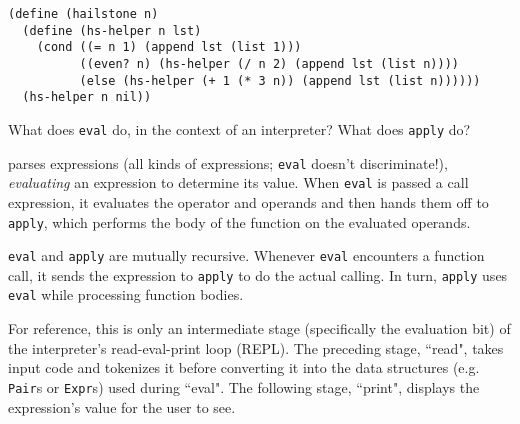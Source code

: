 \documentclass[twoside]{article}
\newcommand{\solution}[1]{{\color{red}#1}}
\begin{document}
\begin{enumerate}

\begin{lstlisting}
(define (hailstone n)
  (define (hs-helper n lst)
    (cond ((= n 1) (append lst (list 1)))
          ((even? n) (hs-helper (/ n 2) (append lst (list n))))
          (else (hs-helper (+ 1 (* 3 n)) (append lst (list n))))))
  (hs-helper n nil))
\end{lstlisting}


What does {\tt eval} do, in the context of an interpreter? What does {\tt apply} do?

\solution{{\tt eval} parses expressions (all kinds of expressions; {\tt eval} doesn't discriminate!), \emph{evaluating} an expression to determine its value. When {\tt eval} is passed a call expression, it evaluates the operator and operands and then hands them off to {\tt apply}, which performs the body of the function on the evaluated operands.

{\tt eval} and {\tt apply} are mutually recursive. Whenever {\tt eval} encounters a function call, it sends the expression to {\tt apply} to do the actual calling. In turn, {\tt apply} uses {\tt eval} while processing function bodies.

For reference, this is only an intermediate stage (specifically the evaluation bit) of the interpreter's read-eval-print loop (REPL). The preceding stage, ``read", takes input code and tokenizes it before converting it into the data structures (e.g. {\tt Pair}s or {\tt Expr}s) used during ``eval". The following stage, ``print", displays the expression's value for the user to see.}

\end{enumerate}
\end{document}
